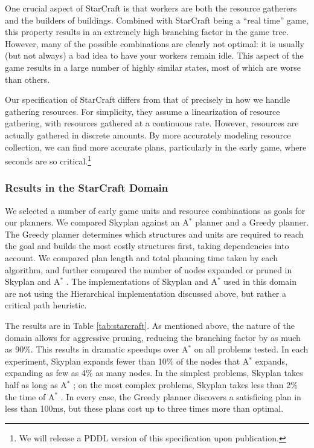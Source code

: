 \documentclass[letterpaper]{article}
\theoremstyle{plain} \newtheorem{theorem}{Theorem} \newtheorem{proposition}{Proposition} \newtheorem{lemma}{Lemma}
\theoremstyle{definition} \newtheorem{definition}{Definition} \newtheorem{conjecture}{Conjecture} \newtheorem*{example}{Example}
\theoremstyle{remark} \newtheorem*{remark}{Remark} \newtheorem*{note}{Note} \newtheorem{case}{Case}
\newcommand{\Astar}{A$^*$ }
\begin{document}
One crucial aspect of StarCraft is that workers are both the resource gatherers
and the builders of buildings. Combined with StarCraft being a ``real time'' game, 
this property results in an extremely high branching factor in the game tree. However,
many of the possible combinations are clearly not optimal: it is usually (but not always) a bad idea
to have your workers remain idle. This aspect of the game results in a large number of highly similar
states, most of which are worse than others.

Our specification of StarCraft differs from that of
\citet{churchill11build} precisely in how we handle gathering
resources. For simplicity, they assume a linearization of resource
gathering, with resources gathered at a continuous rate. However,
resources are actually gathered in discrete amounts. By more
accurately modeling resource collection, we can find more
accurate plans, particularly in the early game, where seconds
are so critical.\footnote{We will release a PDDL version
of this specification upon publication.}

\subsubsection{Results in the StarCraft Domain}
We selected a number of early game units and resource combinations as goals for our planners.
We compared Skyplan against an \Astar planner and a Greedy planner. The Greedy planner determines which 
structures and units are required to reach the goal and builds the most costly structures first, taking dependencies
into account.  We compared plan length and total planning time taken by each algorithm, and further compared the number
of nodes expanded or pruned in Skyplan and \Astar. The implementations of Skyplan and \Astar used in this domain are
not using the Hierarchical implementation discussed above, but rather a critical path heuristic.

The results are in Table \ref{tab:starcraft}. As mentioned above, the nature of the domain allows for aggressive pruning, reducing the branching factor by as much as 90\%.
This results in dramatic speedups over \Astar on all problems tested.
In each experiment, Skyplan expands fewer than 10\% of the nodes that \Astar expands, expanding as few as 4\% as many nodes. 
In the simplest problems, Skyplan takes half as long as \Astar; on the most complex problems, Skyplan takes less than 2\% the time of \Astar. In every case, the Greedy planner discovers a satisficing plan in less than 100ms, 
but these plans cost up to three times more than optimal.
\end{document}
